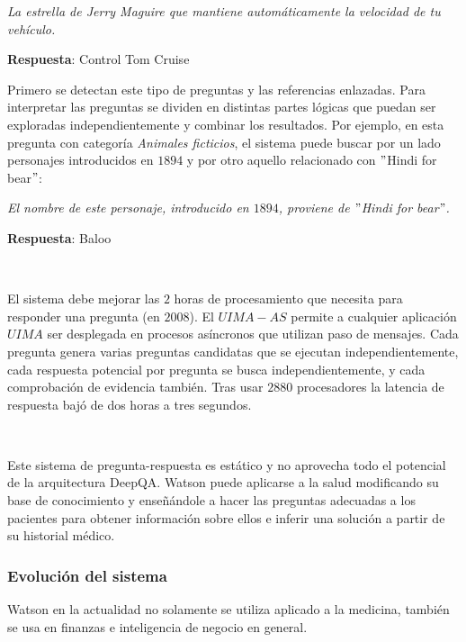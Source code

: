 \documentclass[paper=a4, fontsize=10pt]{scrartcl} %
\numberwithin{equation}{section} %
\numberwithin{figure}{section} %
\numberwithin{table}{section} %
\begin{document}
\begin{center}
\textit{La estrella de Jerry Maguire que mantiene automáticamente la velocidad de tu vehículo.}

\textbf{Respuesta}: Control Tom Cruise
\end{center} 

Primero se detectan este tipo de preguntas y las referencias enlazadas.
Para interpretar las preguntas se dividen en distintas partes lógicas que puedan ser exploradas independientemente y combinar los resultados. %
Por ejemplo, en esta pregunta con categoría \textit{Animales ficticios}, el sistema puede buscar por un lado personajes introducidos en $1894$ y por otro aquello relacionado con $"$Hindi for bear$"$:

\begin{center}
\textit{El nombre de este personaje, introducido en $1894$, proviene de $"$Hindi for bear$"$.}

\textbf{Respuesta}: Baloo
\end{center}

\

El sistema debe mejorar las $2$ horas de procesamiento que necesita para responder una pregunta (en $2008$).
El $UIMA-AS$ permite a cualquier aplicación $UIMA$ ser desplegada en  procesos asíncronos que utilizan paso de mensajes.
Cada pregunta genera varias preguntas candidatas que se ejecutan independientemente, cada respuesta potencial por pregunta se busca independientemente, y cada comprobación de evidencia también.
Tras usar $2880$ procesadores la latencia de respuesta bajó de dos horas a tres segundos. %

\

Este sistema de pregunta-respuesta es estático y no aprovecha todo el potencial de la arquitectura DeepQA.
Watson puede aplicarse a la salud modificando su base de conocimiento y enseñándole a hacer las preguntas adecuadas a los pacientes para obtener información sobre ellos e inferir una solución a partir de su historial médico.

\subsubsection{Evolución del sistema}
Watson en la actualidad no solamente se utiliza aplicado a la medicina, también se usa en finanzas e inteligencia de negocio en general.
\end{document}
